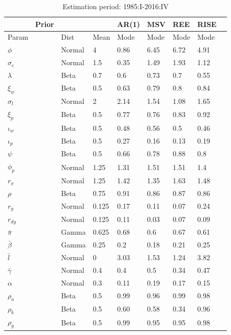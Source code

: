 \documentclass[12pt,reqno]{article}
\numberwithin{equation}{section}
\begin{document}
\begin{table}[H]
\caption{Estimation period: 1985:I-2016:IV}
\begin{tabular}{llll|ll|lll}
 & Prior &  &  & AR(1) & MSV & REE & RISE &  \\
 \hline
 \hline
Param &  & Dist & Mean & Mode & Mode & Mode & Mode &  \\
\hline
\hline
$\phi$ &  & Normal & 4 			& 0.86 & 6.45 & 6.72 & 4.91 &  \\
$\sigma_c$ &  & Normal & 1.5 	& 0.35 & 1.49 & 1.93 & 1.12 &  \\
$\lambda$ &  & Beta & 0.7 		& 0.6 & 0.73 & 0.7 & 0.55 &  \\
$\xi_w$ &  & Beta & 0.5 		& 0.63 & 0.79 & 0.8 & 0.84 &  \\
$\sigma_l$ &  & Normal & 2 		& 2.14 & 1.54 & 1.08 & 1.65 &  \\
$\xi_p$ &  & Beta & 0.5 		& 0.77 & 0.76 & 0.83 & 0.92 &  \\
$\iota_w$ &  & Beta & 0.5 		& 0.48 & 0.56 & 0.5 & 0.46 &  \\
$\iota_p$ &  & Beta & 0.5 		& 0.27 & 0.16 & 0.13 & 0.19 &  \\
$\psi$ &  & Beta & 0.5 			& 0.66 & 0.78 & 0.88 & 0.8 &  \\
$\phi_p$ &  & Normal & 1.25 	& 1.31 & 1.51 & 1.51 & 1.4 &  \\
$r_{\pi}$ &  & Normal & 1.25 	& 1.42 & 1.35 & 1.63 & 1.48 &  \\
$\rho$ &  & Beta & 0.75 		& 0.91 & 0.86 & 0.87 & 0.86 &  \\
$r_y$ &  & Normal & 0.125 		& 0.17 & 0.11 & 0.07 & 0.24 &  \\
$r_{dy}$ &  & Normal & 0.125 	& 0.11 & 0.03 & 0.07 & 0.09 &  \\
$\bar{\pi}$ &  & Gamma & 0.625 	& 0.68 & 0.6 & 0.67 & 0.61 &  \\
$\bar{\beta}$ &  & Gamma & 0.25 & 0.2 & 0.18 & 0.21 & 0.25 &  \\
$\bar{l}$ &  & Normal & 0 		& 3.03 & 1.53 & 1.24 & 3.82 &  \\
$\bar{\gamma}$ &  & Normal & 0.4& 0.4	 & 0.5 & 0.34 & 0.47 &  \\
$\alpha$ &  & Normal & 0.3 		& 0.11 & 0.19 & 0.17 & 0.15 &  \\
$\rho_a$ &  & Beta & 0.5 		& 0.99 & 0.96 & 0.99 & 0.98 &  \\
$\rho_b$ &  & Beta & 0.5 		& 0.60 & 0.58 & 0.34 & 0.96 &  \\
$\rho_g$ &  & Beta & 0.5 		& 0.99 & 0.95 & 0.95 & 0.98 &  \\

\end{tabular}
\end{table}
\end{document}
